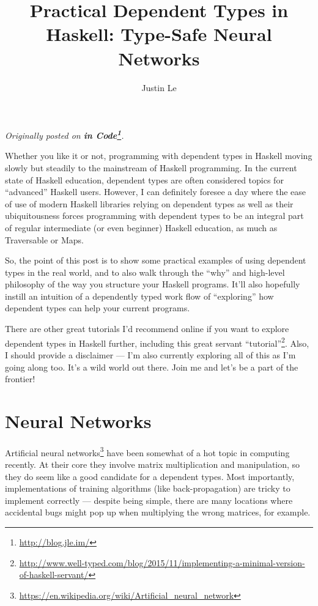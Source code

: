 \documentclass[]{article}
\title{Practical Dependent Types in Haskell: Type-Safe Neural Networks}
\author{Justin Le}
\renewcommand{\href}[2]{#2\footnote{\url{#1}}}
\begin{document}
\maketitle

\emph{Originally posted on \textbf{\href{http://blog.jle.im/}{in
Code}}.}

Whether you like it or not, programming with dependent types in Haskell
moving slowly but steadily to the mainstream of Haskell programming. In
the current state of Haskell education, dependent types are often
considered topics for ``advanced'' Haskell users. However, I can
definitely foresee a day where the ease of use of modern Haskell
libraries relying on dependent types as well as their ubiquitousness
forces programming with dependent types to be an integral part of
regular intermediate (or even beginner) Haskell education, as much as
Traversable or Maps.

So, the point of this post is to show some practical examples of using
dependent types in the real world, and to also walk through the ``why''
and high-level philosophy of the way you structure your Haskell
programs. It'll also hopefully instill an intuition of a dependently
typed work flow of ``exploring'' how dependent types can help your
current programs.

There are other great tutorials I'd recommend online if you want to
explore dependent types in Haskell further, including
\href{http://www.well-typed.com/blog/2015/11/implementing-a-minimal-version-of-haskell-servant/}{this
great servant ``tutorial''}. Also, I should provide a disclaimer --- I'm
also currently exploring all of this as I'm going along too. It's a wild
world out there. Join me and let's be a part of the frontier!

\section{Neural Networks}\label{neural-networks}

\href{https://en.wikipedia.org/wiki/Artificial_neural_network}{Artificial
neural networks} have been somewhat of a hot topic in computing
recently. At their core they involve matrix multiplication and
manipulation, so they do seem like a good candidate for a dependent
types. Most importantly, implementations of training algorithms (like
back-propagation) are tricky to implement correctly --- despite being
simple, there are many locations where accidental bugs might pop up when
multiplying the wrong matrices, for example.
\end{document}
